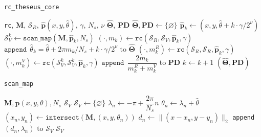 \begin{algorithm}
  \caption{\texttt{rc\_theseus\_core}}
  \begin{spacing}{1.5}
  \begin{algorithmic}[1]
    \REQUIRE \texttt{rc}, $\bm{M}$, $\mathcal{S}_R$, $\hat{\bm{p}}(x, y, \hat{\theta})$, $\gamma$, $N_s$, $\nu$
    \ENSURE $\hat{\bm{\Theta}}$, $\textbf{PD}$
    \STATE $\hat{\bm{\Theta}}, \textbf{PD} \leftarrow \{\varnothing\}$
      \STATE $\hat{\bm{p}}_k \leftarrow (x, y, \hat{\theta} + k \cdot \gamma/2^\nu)$
      \STATE $\mathcal{S}_V^k \leftarrow \texttt{scan\_map}(\bm{M}, \hat{\bm{p}}_k, N_s)$
      \STATE $(\cdot, m_k) \leftarrow \texttt{rc}(\mathcal{S}_R, \mathcal{S}_V, \hat{\bm{p}}_k, \gamma)$
      \STATE $\texttt{append} \ \ \hat{\theta}_k = \hat{\theta} + 2\pi m_k/N_s + k \cdot \gamma/2^\nu$ to $\hat{\bm{\Theta}}$
      \STATE $(\cdot,m_k^{R}) \leftarrow \texttt{rc}(\mathcal{S}_R, \mathcal{S}_R, \hat{\bm{p}}_k, \gamma)$
      \STATE $(\cdot,m_k^{V}) \leftarrow \texttt{rc}(\mathcal{S}_V^k, \mathcal{S}_V^k, \hat{\bm{p}}_k, \gamma)$
      \STATE $\texttt{append} \ \ \dfrac{2m_k}{m_k^{R} + m_k^{V}}$ to \textbf{PD}
      \STATE $k \leftarrow k + 1$
    \ENDFOR
    \RETURN $(\hat{\bm{\Theta}}, \textbf{PD})$
  \end{algorithmic}
  \end{spacing}
  \label{alg:core_theseus}
\end{algorithm}

\begin{algorithm}
  \caption{\texttt{scan\_map}}
  \begin{spacing}{1.3}
    \begin{algorithmic}[1]
      \REQUIRE $\bm{M}, \bm{p}(x, y, \theta), N_s$
      \ENSURE $\mathcal{S}_V$
      \STATE $\mathcal{S}_V \leftarrow \{\varnothing\}$
      \STATE $\lambda_n \leftarrow -\pi + \dfrac{2\pi}{N_s} n$
      \STATE $\theta_n \leftarrow \lambda_n + \hat{\theta}$
      \STATE $(x_n,y_n) \leftarrow \texttt{intersect}(\bm{M}, (x,y, \theta_n))$
      \STATE $d_n \leftarrow \|(x- x_n, y-y_n)\|_2$
      \STATE \texttt{append} $(d_n, \lambda_n)$ to $\mathcal{S}_V$
      \ENDFOR
      \RETURN $\mathcal{S}_V$
    \end{algorithmic}
  \end{spacing}
  \label{alg:scan_map}
\end{algorithm}

